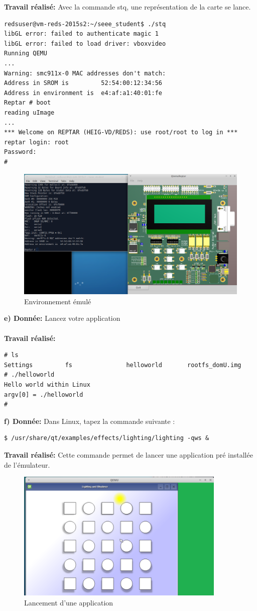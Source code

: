 \textbf{Travail réalisé: } Avec la commande stq, une représentation de la carte se lance.
\begin{lstlisting}
redsuser@vm-reds-2015s2:~/seee_student$ ./stq 
libGL error: failed to authenticate magic 1
libGL error: failed to load driver: vboxvideo
Running QEMU
...
Warning: smc911x-0 MAC addresses don't match:
Address in SROM is         52:54:00:12:34:56
Address in environment is  e4:af:a1:40:01:fe
Reptar # boot
reading uImage
...
*** Welcome on REPTAR (HEIG-VD/REDS): use root/root to log in ***
reptar login: root
Password: 
# 
\end{lstlisting}
\begin{figure}[H]
	\begin{center}
		\includegraphics[width=18cm]{img/linux.png}
		\caption{Environnement émulé}
		\label{linux}
	\end{center}
\end{figure}
\textbf{e) Donnée: }Lancez votre application\\\\
\textbf{Travail réalisé: }
\begin{lstlisting}
# ls
Settings         fs               helloworld       rootfs_domU.img
# ./helloworld 
Hello world within Linux
argv[0] = ./helloworld
# 
\end{lstlisting}
\textbf{f) Donnée: }Dans Linux, tapez la commande suivante :
\begin{lstlisting}
$ /usr/share/qt/examples/effects/lighting/lighting -qws & 
\end{lstlisting}
\textbf{Travail réalisé: }Cette commande permet de lancer une application pré installée de l'émulateur.
\begin{figure}[H]
	\begin{center}
		\includegraphics[width=10cm]{img/linux2.png}
		\caption{Lancement d'une application}
		\label{linux2}
	\end{center}
\end{figure}
